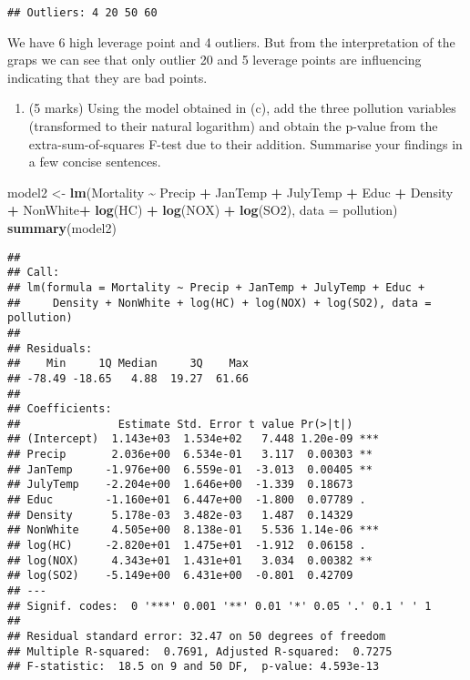 \documentclass[
]{article}
\newenvironment{Shaded}{\begin{snugshade}}{\end{snugshade}}
\newcommand{\AttributeTok}[1]{\textcolor[rgb]{0.13,0.29,0.53}{#1}}
\newcommand{\FunctionTok}[1]{\textcolor[rgb]{0.13,0.29,0.53}{\textbf{#1}}}
\newcommand{\NormalTok}[1]{#1}
\newcommand{\OtherTok}[1]{\textcolor[rgb]{0.56,0.35,0.01}{#1}}
\newcommand{\SpecialCharTok}[1]{\textcolor[rgb]{0.81,0.36,0.00}{\textbf{#1}}}
\providecommand{\tightlist}{%
  \setlength{\itemsep}{0pt}\setlength{\parskip}{0pt}}
\begin{document}
\begin{verbatim}
## Outliers: 4 20 50 60
\end{verbatim}

We have 6 high leverage point and 4 outliers. But from the
interpretation of the graps we can see that only outlier 20 and 5
leverage points are influencing indicating that they are bad points.

\begin{enumerate}
\def\labelenumi{(\alph{enumi})}
\setcounter{enumi}{4}
\tightlist
\item
  (5 marks) Using the model obtained in (c), add the three pollution
  variables (transformed to their natural logarithm) and obtain the
  p-value from the extra-sum-of-squares F-test due to their addition.
  Summarise your findings in a few concise sentences.
\end{enumerate}

\begin{Shaded}
\begin{Highlighting}[]
\NormalTok{model2 }\OtherTok{\textless{}{-}} \FunctionTok{lm}\NormalTok{(Mortality }\SpecialCharTok{\textasciitilde{}}\NormalTok{ Precip }\SpecialCharTok{+}\NormalTok{ JanTemp }\SpecialCharTok{+}\NormalTok{ JulyTemp }\SpecialCharTok{+}\NormalTok{ Educ }\SpecialCharTok{+}\NormalTok{ Density }\SpecialCharTok{+}\NormalTok{ NonWhite}\SpecialCharTok{+} \FunctionTok{log}\NormalTok{(HC) }\SpecialCharTok{+} \FunctionTok{log}\NormalTok{(NOX) }\SpecialCharTok{+} \FunctionTok{log}\NormalTok{(SO2), }\AttributeTok{data =}\NormalTok{ pollution)}
\FunctionTok{summary}\NormalTok{(model2)}
\end{Highlighting}
\end{Shaded}

\begin{verbatim}
## 
## Call:
## lm(formula = Mortality ~ Precip + JanTemp + JulyTemp + Educ + 
##     Density + NonWhite + log(HC) + log(NOX) + log(SO2), data = pollution)
## 
## Residuals:
##    Min     1Q Median     3Q    Max 
## -78.49 -18.65   4.88  19.27  61.66 
## 
## Coefficients:
##               Estimate Std. Error t value Pr(>|t|)    
## (Intercept)  1.143e+03  1.534e+02   7.448 1.20e-09 ***
## Precip       2.036e+00  6.534e-01   3.117  0.00303 ** 
## JanTemp     -1.976e+00  6.559e-01  -3.013  0.00405 ** 
## JulyTemp    -2.204e+00  1.646e+00  -1.339  0.18673    
## Educ        -1.160e+01  6.447e+00  -1.800  0.07789 .  
## Density      5.178e-03  3.482e-03   1.487  0.14329    
## NonWhite     4.505e+00  8.138e-01   5.536 1.14e-06 ***
## log(HC)     -2.820e+01  1.475e+01  -1.912  0.06158 .  
## log(NOX)     4.343e+01  1.431e+01   3.034  0.00382 ** 
## log(SO2)    -5.149e+00  6.431e+00  -0.801  0.42709    
## ---
## Signif. codes:  0 '***' 0.001 '**' 0.01 '*' 0.05 '.' 0.1 ' ' 1
## 
## Residual standard error: 32.47 on 50 degrees of freedom
## Multiple R-squared:  0.7691, Adjusted R-squared:  0.7275 
## F-statistic:  18.5 on 9 and 50 DF,  p-value: 4.593e-13
\end{verbatim}
\end{document}
